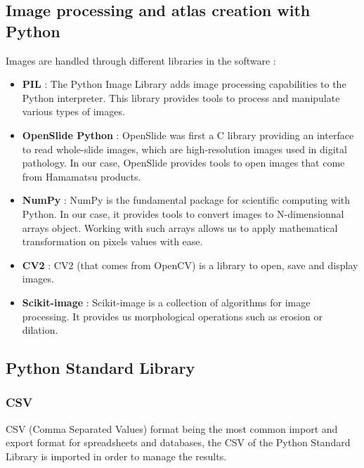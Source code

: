 \documentclass[a4paper,12pt]{report}
\begin{document}
\subsection{Image processing and atlas creation with Python}
Images are handled through different libraries in the software :
\vspace{0.5\baselineskip}
\begin{itemize}
    \item \textbf{PIL} : The Python Image Library adds image processing capabilities to the Python interpreter. This library provides tools to process and manipulate various types of images.
    \vspace{0.05\baselineskip}
    \item \textbf{OpenSlide Python} : OpenSlide was first a C library providing an interface to read whole-slide images, which are high-resolution images used in digital pathology. In our case, OpenSlide provides tools to open images that come from Hamamatsu products.
    \vspace{0.5\baselineskip}
    \item \textbf{NumPy} : NumPy is the fundamental package for scientific computing with Python. In our case, it provides tools to convert images to N-dimensionnal arrays object. Working with such arrays allows us to apply mathematical transformation on pixels values with ease. 
    \vspace{0.5\baselineskip}
    \item \textbf{CV2} : CV2 (that comes from OpenCV) is a library to open, save and display images.
    \vspace{0.5\baselineskip}
    \item \textbf{Scikit-image} : Scikit-image is a collection of algorithms for image processing. It provides us morphological operations such as erosion or dilation.\\
\end{itemize}

\subsection{Python Standard Library}
\subsubsection{CSV}
CSV (Comma Separated Values) format being the most common import and export format for spreadsheets and databases, the CSV of the Python Standard Library is imported in order to manage the results.
\end{document}

